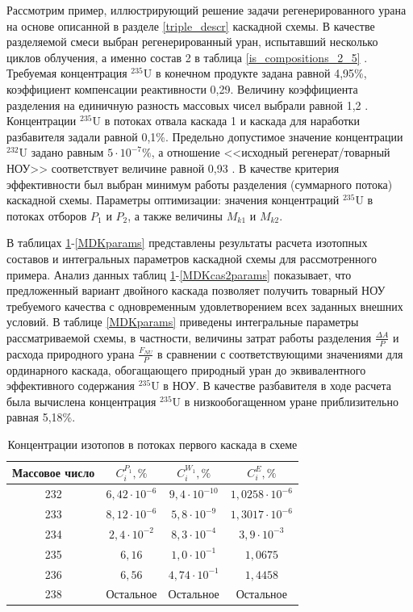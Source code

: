 Рассмотрим пример, иллюстрирующий решение задачи регенерированного урана на основе описанной в разделе \ref{triple_descr} каскадной схемы. В качестве разделяемой смеси выбран регенерированный уран, испытавший несколько циклов облучения, а именно состав 2 в таблица \ref{is_compositions_2_5} \cite{smirnovObogashchenieRegenerirovannogoUrana2018}. Требуемая концентрация $^{235}$U в конечном продукте задана равной 4,95\%, коэффициент компенсации реактивности 0,29. Величину коэффициента разделения на единичную разность массовых чисел выбрали равной 1,2 \cite{smirnovKaskadnyeShemyZadachah2012}. Концентрации $^{235}$U в потоках отвала каскада 1 и каскада для наработки разбавителя задали равной 0,1\%. Предельно допустимое значение концентрации $^{232}$U задано равным $5\cdot10^{-7} \%$, а отношение <<исходный регенерат/товарный НОУ>> соответствует величине равной 0,93 \cite{smirnovObogashchenieRegenerirovannogoUrana2018}. В качестве критерия эффективности был выбран минимум работы разделения (суммарного потока) каскадной схемы. Параметры оптимизации: значения концентраций $^{235}$U в потоках отборов $P_1$ и $P_2$, а также величины $M_{k1}$ и $M_{k2}$. 

В таблицах \ref{MDKcas1params}-\ref{MDKparams} представлены результаты расчета изотопных составов и интегральных параметров каскадной схемы для рассмотренного примера. Анализ данных таблиц \ref{MDKcas1params}-\ref{MDKcas2params} показывает, что предложенный вариант двойного каскада позволяет получить товарный НОУ требуемого качества с одновременным удовлетворением всех заданных внешних условий. В таблице \ref{MDKparams} приведены интегральные параметры рассматриваемой схемы, в частности, величины затрат работы разделения $\frac{\Delta A}{P}$ и расхода природного урана $\frac{F_{NU}}{P}$ в сравнении с соответствующими значениями для ординарного каскада, обогащающего природный уран до эквивалентного эффективного содержания $^{235}$U в НОУ.
В качестве разбавителя в ходе расчета была вычислена концентрация $^{235}$U  в низкообогащенном уране приблизительно равная 5,18\%.    


\begin{table}[ht]
\begin{tabular}{|c|c|c|c|}
    \hline Массовое число & $C_{i}^{P_{1}}, \%$ & $C_{i}^{W_{1}}, \%$ & $C_{i}^{E}, \%$\\
    \hline 232 & $6,42\cdot10^{-6}$ & $9,4\cdot10^{-10}$ & $1,0258\cdot10^{-6}$\\
    233 & $8,12\cdot10^{-6}$ & $5,8\cdot10^{-9}$ & $1,3017\cdot10^{-6}$\\
    234 & $2,4\cdot10^{-2}$ & $8,3\cdot10^{-4}$ & $3,9\cdot10^{-3}$\\
    235 & $6,16$ & $1,0\cdot10^{-1}$ & $1,0675$\\
    236 & $6,56$ & $4,74\cdot10^{-1}$ & $1,4458$\\
    238 & Остальное & Остальное & Остальное\\
    \hline
\end{tabular}
\caption{Концентрации изотопов в потоках первого каскада в схеме}\label{MDKcas1params}
\end{table}

